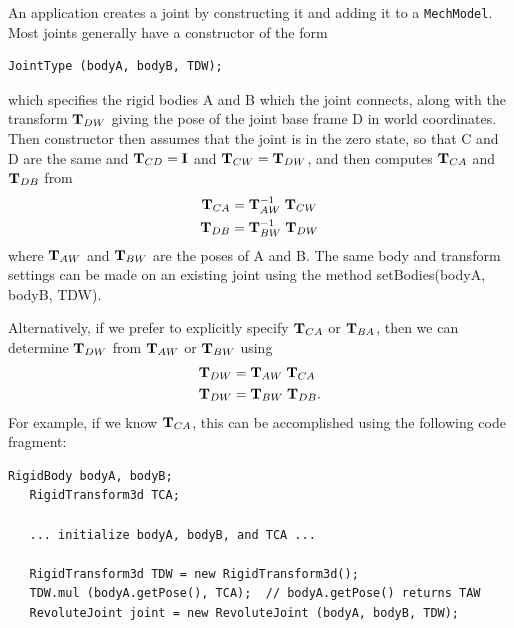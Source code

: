 An application creates a joint by constructing it and adding it to a
{\tt MechModel}. Most joints generally have a constructor of the form
%
\begin{lstlisting}[]
  JointType (bodyA, bodyB, TDW);
\end{lstlisting}
%
which specifies the rigid bodies A and B which the joint connects,
along with the transform ${\bf T}_{DW}$ giving the pose of the joint base
frame D in world coordinates. Then constructor then assumes that the
joint is in the zero state, so that C and D are the same and
${\bf T}_{CD} = {\bf I}$ and ${\bf T}_{CW} = {\bf T}_{DW}$, and then computes
${\bf T}_{CA}$ and ${\bf T}_{DB}$ from
%
\begin{align}
{\bf T}_{CA} & = {\bf T}_{AW}^{-1} \; {\bf T}_{CW} \\
{\bf T}_{DB} & = {\bf T}_{BW}^{-1} \; {\bf T}_{DW}
\end{align}
%
where ${\bf T}_{AW}$ and ${\bf T}_{BW}$ are the poses of A and B.
The same body and transform settings can be made on an existing
joint using the method
{setBodies(bodyA, bodyB, TDW)}.

Alternatively, if we prefer to explicitly specify ${\bf T}_{CA}$ or ${\bf T}_{BA}$, then we
can determine ${\bf T}_{DW}$ from ${\bf T}_{AW}$ or ${\bf T}_{BW}$ using
%
\begin{align}
{\bf T}_{DW} & = {\bf T}_{AW} \; {\bf T}_{CA} \\
{\bf T}_{DW} & = {\bf T}_{BW} \; {\bf T}_{DB}.
\end{align}
%
For example, if we know ${\bf T}_{CA}$, this can be accomplished using
the following code fragment:
%
\begin{lstlisting}[]
   RigidBody bodyA, bodyB;
   RigidTransform3d TCA;

   ... initialize bodyA, bodyB, and TCA ...
   
   RigidTransform3d TDW = new RigidTransform3d();
   TDW.mul (bodyA.getPose(), TCA);  // bodyA.getPose() returns TAW
   RevoluteJoint joint = new RevoluteJoint (bodyA, bodyB, TDW);
\end{lstlisting}
%

